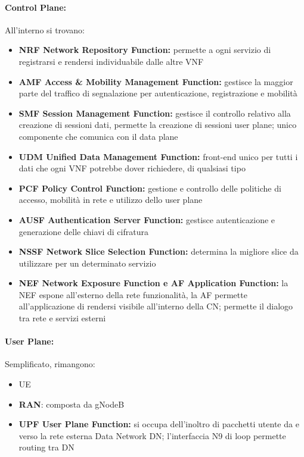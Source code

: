 \paragraph{Control Plane:} All'interno si trovano:
\begin{itemize}
    \item \textbf{NRF Network Repository Function:} permette a ogni servizio di registrarsi e rendersi individuabile dalle altre VNF
    
    \item \textbf{AMF Access \& Mobility Management Function:} gestisce la maggior parte del traffico di segnalazione per autenticazione, registrazione e mobilità
    
    \item \textbf{SMF Session Management Function:} gestisce il controllo relativo alla creazione di sessioni dati, permette la creazione di sessioni user plane; unico componente che comunica con il data plane
    
    \item \textbf{UDM Unified Data Management Function:} front-end unico per tutti i dati che ogni VNF potrebbe dover richiedere, di qualsiasi tipo
    
    \item \textbf{PCF Policy Control Function:} gestione e controllo delle politiche di accesso, mobilità in rete e utilizzo dello user plane
    
    \item \textbf{AUSF Authentication Server Function:} gestisce autenticazione e generazione delle chiavi di cifratura
    
    \item \textbf{NSSF Network Slice Selection Function:} determina la migliore slice da utilizzare per un determinato servizio
    
    \item \textbf{NEF Network Exposure Function e AF Application Function:} la NEF espone all'esterno della rete funzionalità, la AF permette all'applicazione di rendersi visibile all'interno della CN; permette il dialogo tra rete e servizi esterni
\end{itemize}

\paragraph{User Plane:} Semplificato, rimangono: 
\begin{itemize}
    \item UE
    
    \item \textbf{RAN}: composta da gNodeB
    
    \item \textbf{UPF User Plane Function:} si occupa dell'inoltro di pacchetti utente da e verso la rete esterna Data Network DN; l'interfaccia N9 di loop permette routing tra DN
\end{itemize}

